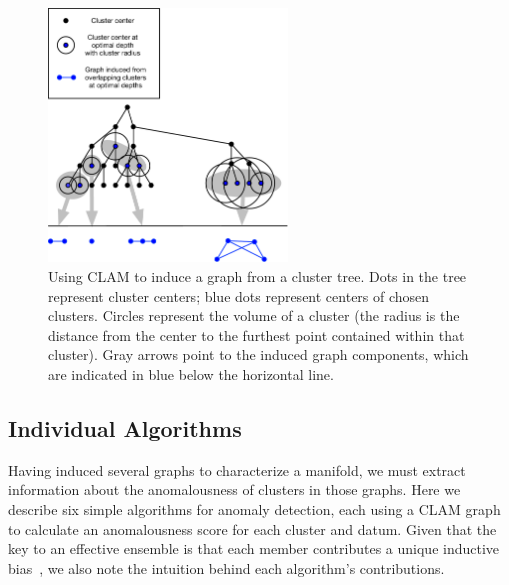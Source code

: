 
\begin{figure}[ht!]
    \centering
    \includegraphics[width=2.5in]{images/tree-graph.pdf}
    \caption{Using CLAM to induce a graph from a cluster tree.
        Dots in the tree represent cluster centers;
        blue dots represent centers of chosen clusters.
        Circles represent the volume of a cluster (the radius is the distance from the center to the furthest point contained within that cluster).
        Gray arrows point to the induced graph components, which are indicated in blue below the horizontal line.}
    \label{fig:methods:graph-generation}
\end{figure}


\subsection{Individual Algorithms}
\label{subsec:methods:individual-algorithms}

Having induced several graphs to characterize a manifold, we must extract information about the anomalousness of clusters in those graphs.
Here we describe six simple algorithms for anomaly detection, each using a CLAM graph to calculate an anomalousness score for each cluster and datum.
Given that the key to an effective ensemble is that each member contributes a unique inductive bias~\cite{chen2017outlier}, we also note the intuition behind each algorithm's contributions.

